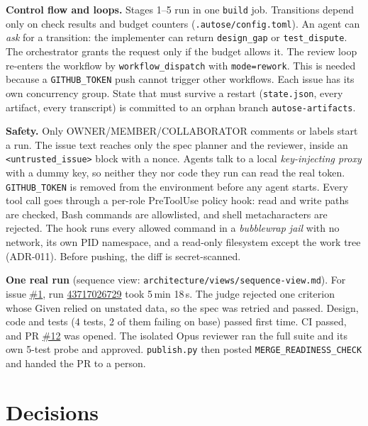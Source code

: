 \documentclass[11pt,a4paper]{article}
\newcommand{\gh}[1]{\href{https://github.com/iDheer/tinydb/#1}}
\newcommand{\run}[1]{\href{https://github.com/iDheer/tinydb/actions/runs/#1}{#1}}
\begin{document}
\textbf{Control flow and loops.} Stages 1--5 run in one \texttt{build} job. Transitions depend only
on check results and budget counters (\texttt{.autose/config.toml}). An agent can \emph{ask} for a
transition: the implementer can return \texttt{design\_gap} or \texttt{test\_dispute}. The
orchestrator grants the request only if the budget allows it. The review loop re-enters the workflow
by \texttt{workflow\_dispatch} with \texttt{mode=rework}. This is needed because a
\texttt{GITHUB\_TOKEN} push cannot trigger other workflows. Each issue has its own concurrency group.
State that must survive a restart (\texttt{state.json}, every artifact, every transcript) is
committed to an orphan branch \texttt{autose-artifacts}.

\textbf{Safety.} Only OWNER/MEMBER/COLLABORATOR comments or labels start a run. The issue text
reaches only the spec planner and the reviewer, inside an \texttt{<untrusted\_issue>} block with a
nonce. Agents talk to a local \emph{key-injecting proxy} with a dummy key, so neither they nor code
they run can read the real token. \texttt{GITHUB\_TOKEN} is removed from the environment before any
agent starts. Every tool call goes through a per-role PreToolUse policy hook: read and write paths
are checked, Bash commands are allowlisted, and shell metacharacters are rejected. The hook runs
every allowed command in a \emph{bubblewrap jail} with no network, its own PID namespace, and a
read-only filesystem except the work tree (ADR-011). Before pushing, the diff is secret-scanned.

\textbf{One real run} (sequence view: \texttt{architecture/views/sequence-view.md}). For issue
\gh{issues/1}{\#1}, run \run{43717026729} took 5\,min 18\,s. The judge rejected one
criterion whose Given relied on unstated data, so the spec was retried and passed. Design, code and
tests (4 tests, 2 of them failing on base) passed first time. CI passed, and PR \gh{pull/12}{\#12}
was opened. The isolated Opus reviewer ran the full suite and its own 5-test probe and approved.
\texttt{publish.py} then posted \texttt{MERGE\_READINESS\_CHECK} and handed the PR to a person.

\section{Decisions}
\end{document}
